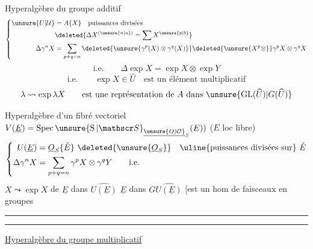Hyperalgèbre du groupe additif
\[
\left\{
\begin{aligned}
\unsure{U|\mathcal U}&=A\{X\}\quad\text{puissances divisées}\\
&\deleted{\Delta X^{(\unsure{n|u})}=\sum X^{\unsure{p|b}}}\\
\Delta\gamma^nX&=\sum_{p+q=n}\deleted{\unsure{\gamma^p(X)\otimes\gamma^q(X)}}\deleted{\unsure{X^p\otimes}}\gamma^pX\otimes\gamma^qX
\end{aligned}\right.
\]
\[
\text{i.e.}\qquad\Delta\exp X=\exp X\otimes\exp Y
\]
\[
\text{i.e.}\qquad\exp X\in\widehat U\quad\text{est un élément multiplicatif}
\]
\[
\lambda\leadsto\exp\lambda X\qquad\text{est une représentation de }A\text{ dans }\unsure{\operatorname{GL}(\widehat U)|G(\widehat U)}
\]

Hyperalgèbre d'un  fibré vectoriel $V(\underline E)=\operatorname{Spec}\unsure{\operatorname{S}|\mathscr S}_{\underline{\unsure{O|\mathcal O}}_S}(E))$ ($E$ loc libre)
\[
\left\{
\begin{aligned}
U(\underline E)&=\underline O_S\{\check E\}\ \deleted{\unsure{\underline O_S}}\quad\text{\uline{puissances divisées sur}}\ \check E\\
\Delta\gamma^nX&=\sum_{p+q=n}\gamma^pX\otimes\gamma^qY\qquad\text{i.e.}
\end{aligned}\right.
\]
$X\leadsto\exp X$ de $\underline E$ dans $\widehat{U(\underline E)}$   $\underline E$ dans $G\widehat{U(\underline E)}$ [est un hom de faisceaux en groupes 

\smallskip\hrule\smallskip\hrule\medskip
\uline{Hyperalgèbre du groupe multiplicatif}
